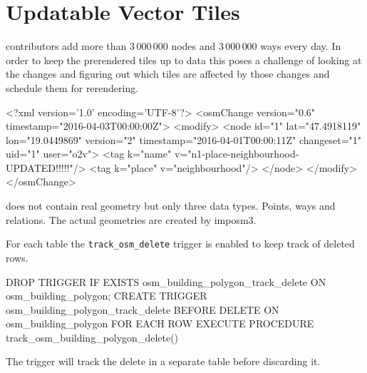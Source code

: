 \chapter{Updatable Vector Tiles}

\osm{} contributors add more than $3\,000\,000$ nodes and $3\,000\,000$ ways every day.
In order to keep the prerendered tiles up to data this poses a challenge of looking at the changes
and figuring out which tiles are affected by those changes and schedule them for rerendering.


\begin{listing}[H]
  \centering
  \begin{xmlcode}
<?xml version='1.0' encoding='UTF-8'?>
<osmChange version="0.6" timestamp="2016-04-03T00:00:00Z">
<modify>
    <node id="1" lat="47.4918119" lon="19.0449869" version="2"
          timestamp="2016-04-01T00:00:11Z" changeset="1" uid="1" user="o2v">
        <tag k="name" v="n1-place-neighbourhood-UPDATED!!!!!"/>
        <tag k="place" v="neighbourhood"/>
    </node>
</modify>
</osmChange>
  \end{xmlcode}
  \caption{}
\end{listing}



\osm{} does not contain real geometry but only three data types. Points, ways and relations.
The actual geometries are created by imposm3.


For each table the \texttt{track\_osm\_delete} trigger is enabled to keep track of deleted rows.

\begin{listing}[H]
  \centering
  \begin{sqlcode}
    DROP TRIGGER IF EXISTS osm_building_polygon_track_delete ON osm_building_polygon;
    CREATE TRIGGER osm_building_polygon_track_delete
    BEFORE DELETE ON osm_building_polygon
    FOR EACH ROW EXECUTE PROCEDURE track_osm_building_polygon_delete()
  \end{sqlcode}
  \caption{}
\end{listing}

The trigger will track the delete in a separate table before discarding it.

\begin{listing}[H]
  \centering
  \caption{}
\end{listing}


